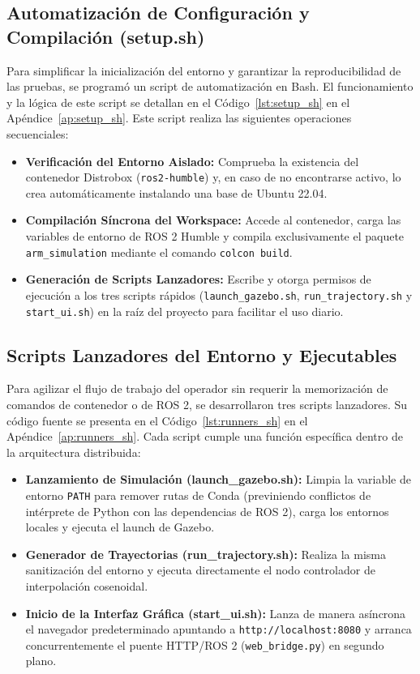 \documentclass[conference,a4paper]{IEEEtran}
\begin{document}
\subsection{Automatización de Configuración y Compilación (setup.sh)}
Para simplificar la inicialización del entorno y garantizar la reproducibilidad de las pruebas, se programó un script de automatización en Bash. El funcionamiento y la lógica de este script se detallan en el Código~\ref{lst:setup_sh} en el Apéndice~\ref{ap:setup_sh}.
Este script realiza las siguientes operaciones secuenciales:
\begin{itemize}
    \item \textbf{Verificación del Entorno Aislado:} Comprueba la existencia del contenedor Distrobox (\texttt{ros2-humble}) y, en caso de no encontrarse activo, lo crea automáticamente instalando una base de Ubuntu 22.04.
    \item \textbf{Compilación Síncrona del Workspace:} Accede al contenedor, carga las variables de entorno de ROS 2 Humble y compila exclusivamente el paquete \texttt{arm\_simulation} mediante el comando \texttt{colcon build}.
    \item \textbf{Generación de Scripts Lanzadores:} Escribe y otorga permisos de ejecución a los tres scripts rápidos (\texttt{launch\_gazebo.sh}, \texttt{run\_trajectory.sh} y \texttt{start\_ui.sh}) en la raíz del proyecto para facilitar el uso diario.
\end{itemize}

\subsection{Scripts Lanzadores del Entorno y Ejecutables}
Para agilizar el flujo de trabajo del operador sin requerir la memorización de comandos de contenedor o de ROS 2, se desarrollaron tres scripts lanzadores. Su código fuente se presenta en el Código~\ref{lst:runners_sh} en el Apéndice~\ref{ap:runners_sh}.
Cada script cumple una función específica dentro de la arquitectura distribuida:
\begin{itemize}
    \item \textbf{Lanzamiento de Simulación (launch\_gazebo.sh):} Limpia la variable de entorno \texttt{PATH} para remover rutas de Conda (previniendo conflictos de intérprete de Python con las dependencias de ROS 2), carga los entornos locales y ejecuta el launch de Gazebo.
    \item \textbf{Generador de Trayectorias (run\_trajectory.sh):} Realiza la misma sanitización del entorno y ejecuta directamente el nodo controlador de interpolación cosenoidal.
    \item \textbf{Inicio de la Interfaz Gráfica (start\_ui.sh):} Lanza de manera asíncrona el navegador predeterminado apuntando a \texttt{http://localhost:8080} y arranca concurrentemente el puente HTTP/ROS 2 (\texttt{web\_bridge.py}) en segundo plano.
\end{itemize}
\end{document}
